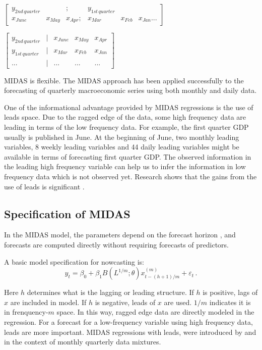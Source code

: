 \begin{center}
	$\begin{bmatrix}
	y_{2nd \, quarter}  &  &  ;& y_{1st \, quarter}\\
	x_{June} & x_{May} & x_{Apr} ;& x_{Mar} & x_{Feb} & x_{Jan} ...
	
	\end{bmatrix}$
	
	$\begin{bmatrix}
	
	
   y_{2nd \, quarter} & | & x_{June} & x_{May} & x_{Apr}\\
   y_{1st \, quarter} &	| & x_{Mar} & x_{Feb} & x_{Jan}\\
	... & | & ... &...& ...
	
	\end{bmatrix}$
\end{center}


MIDAS is flexible. The MIDAS approach has been applied successfully to the forecasting of quarterly macroeconomic series using both monthly \cite{Clements2008, Clements2009, Kuzin2011} and daily \cite{Andreou2013a, Ghysels2009} data.

One of the informational advantage provided by MIDAS regressions is the use of leads space\cite{Clements2008}. Due to the ragged edge of the data, some high frequency data are leading in terms of the low frequency data. For example, the first quarter GDP usually is published in June. At the beginning of June, two monthly leading variables, 8 weekly leading variables and 44 daily leading variables might be available in terms of forecasting first quarter GDP. The observed information in the leading high frequency variable can help us to infer the information in low frequency data which is not observed yet. Research  shows that  the gains from the use of leads is significant \cite{Andreou2013a}.

\subsection{Specification of MIDAS}  

In the MIDAS model,  the parameters depend on the forecast horizon , and forecasts are computed directly without requiring forecasts of predictors.

A basic model specification for nowcasting is: 
$$y_t=\beta_0 + \beta_1B(L^{1/m};\theta)x_{t-(h+1)/m}^{(m)} + \varepsilon_t  \, .$$

Here $h$ determines what is the lagging or leading structure. If $h$ is positive, lags of $x$ are included in model. If $h$ is negative, leads of  $x$ are used. $1/m$ indicates it is in frenquency-$m$ space. In this way, ragged edge data are directly modeled in the regression. For a forecast for a low-frequency variable using high frequency data, leads are more important. MIDAS regressions with leads, were introduced by    and  in the context of monthly quarterly data mixtures.

